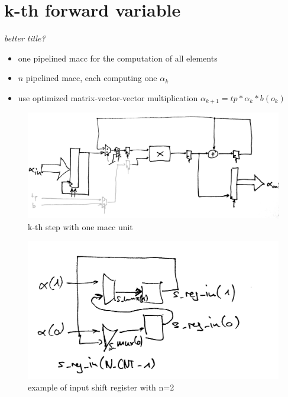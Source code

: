 \documentclass[mscthesis]{usiinfthesis}
\begin{document}
\section{k-th forward variable}
\emph{\color{red}better title?}

\begin{itemize}
    \item one pipelined macc for the computation of all elements
    \item $ n $ pipelined macc, each computing one $ \alpha_k $
    \item use optimized matrix-vector-vector multiplication
        $ \alpha_{k+1} = tp * \alpha_k * b(o_k) $
        \cite{FCCM12_Kestur, ITNG07_Yang}
\end{itemize}

\begin{figure}
    \includegraphics[width=1\columnwidth]{./schema/arch_step_s.png}
    \caption{k-th step with one macc unit}
    \label{fig:step_s}
\end{figure}
\begin{figure}
    \includegraphics[width=1\columnwidth]{./schema/arch_shift_reg_s.png}
    \caption{example of input shift register with n=2}
    \label{fig:shift_reg_s}
\end{figure}
\end{document}

